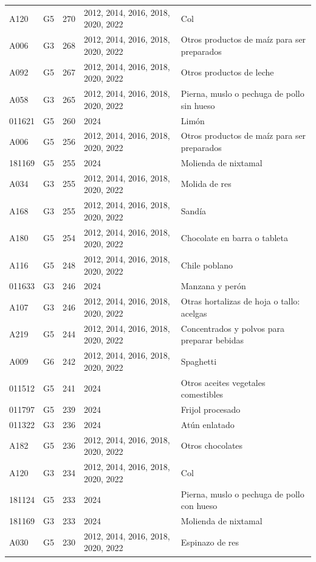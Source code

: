 \begin{table}[ht]
\begin{tabular}{llrll}
  A120 & G5 & 270 & 2012, 2014, 2016, 2018, 2020, 2022 & Col \\ 
  A006 & G3 & 268 & 2012, 2014, 2016, 2018, 2020, 2022 & Otros productos de maíz para ser preparados \\ 
  A092 & G5 & 267 & 2012, 2014, 2016, 2018, 2020, 2022 & Otros productos de leche \\ 
  A058 & G3 & 265 & 2012, 2014, 2016, 2018, 2020, 2022 & Pierna, muslo o pechuga de pollo sin hueso \\ 
  011621 & G5 & 260 & 2024 & Limón \\ 
  A006 & G5 & 256 & 2012, 2014, 2016, 2018, 2020, 2022 & Otros productos de maíz para ser preparados \\ 
  181169 & G5 & 255 & 2024 & Molienda de nixtamal \\ 
  A034 & G3 & 255 & 2012, 2014, 2016, 2018, 2020, 2022 & Molida de res \\ 
  A168 & G3 & 255 & 2012, 2014, 2016, 2018, 2020, 2022 & Sandía \\ 
  A180 & G5 & 254 & 2012, 2014, 2016, 2018, 2020, 2022 & Chocolate en barra o tableta \\ 
  A116 & G5 & 248 & 2012, 2014, 2016, 2018, 2020, 2022 & Chile poblano \\ 
  011633 & G3 & 246 & 2024 & Manzana y perón \\ 
  A107 & G3 & 246 & 2012, 2014, 2016, 2018, 2020, 2022 & Otras hortalizas de hoja o tallo: acelgas \\ 
  A219 & G5 & 244 & 2012, 2014, 2016, 2018, 2020, 2022 & Concentrados y polvos para preparar bebidas \\ 
  A009 & G6 & 242 & 2012, 2014, 2016, 2018, 2020, 2022 & Spaghetti \\ 
  011512 & G5 & 241 & 2024 & Otros aceites vegetales comestibles \\ 
  011797 & G5 & 239 & 2024 & Frijol procesado \\ 
  011322 & G3 & 236 & 2024 & Atún enlatado \\ 
  A182 & G5 & 236 & 2012, 2014, 2016, 2018, 2020, 2022 & Otros chocolates \\ 
  A120 & G3 & 234 & 2012, 2014, 2016, 2018, 2020, 2022 & Col \\ 
  181124 & G5 & 233 & 2024 & Pierna, muslo o pechuga de pollo con hueso \\ 
  181169 & G3 & 233 & 2024 & Molienda de nixtamal \\ 
  A030 & G5 & 230 & 2012, 2014, 2016, 2018, 2020, 2022 & Espinazo de res \\ 

\end{tabular}
\end{table}
